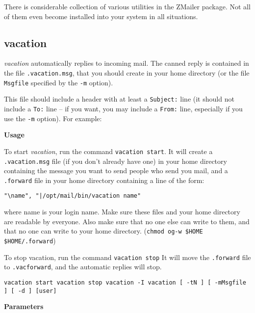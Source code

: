 
There is considerable collection of various utilities in the
ZMailer package. Not all of them even become installed into
your system in all situations.



\subsection{vacation}

{\em vacation\/} automatically replies to incoming mail. The canned 
reply is contained in the file {\tt .vacation.msg}, that you should 
create in your home directory (or the file {\tt Msgfile} specified by 
the {\tt -m} option).

This file should include a header with at least a {\tt Subject:} line 
(it should not include a {\tt To:} line -- if you want, you may include 
a {\tt From:} line, especially if you use the {\tt -m} option). 
For example:

{\bf Usage}

To start {\em vacation\/}, run the command {\tt vacation start}. 
It will create a {\tt .vacation.msg} file (if you don't already 
have one) in your home directory containing the message you want to send 
people who send you mail, and a {\tt .forward} file in your home 
directory containing a line of the form:

\begin{verbatim}
"\name", "|/opt/mail/bin/vacation name"
\end{verbatim}


where name is your login name. Make sure these files and your home 
directory are readable by everyone. Also  make sure  that  no  one  
else  can  write  to  them,  and  that  no  one  can  write  to  your  
home  directory. ({\tt chmod og-w \$HOME \$HOME/.forward})

To stop vacation, run the command {\tt vacation stop} It will move the 
{\tt .forward} file to {\tt .vacforward}, and the automatic 
replies will stop.

{\tt vacation start vacation stop vacation -I vacation [ -tN ] [ -mMsgfile ] [ -d ] [user]}

{\bf Parameters}

